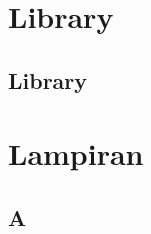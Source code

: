 \documentclass[11pt,b5paper,oneside,titlepage]{book}
\begin{document}
	\part{Library}
	\chapter{Library}\label{library}
	
	
	\appendix
	

	\backmatter
	\part{Lampiran}	

	\chapter{A}
	
	\printindex
\end{document}
